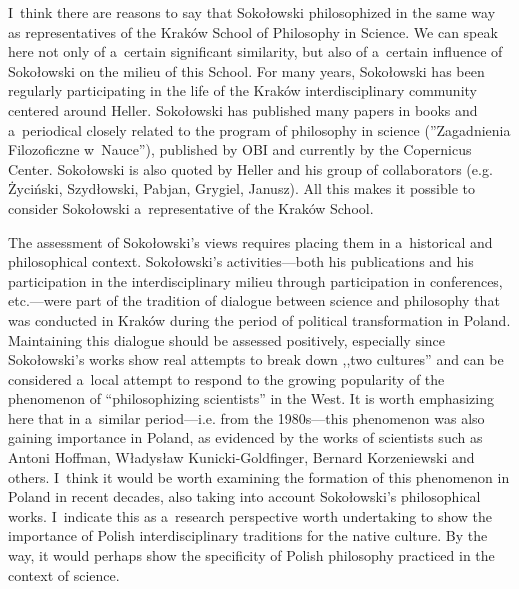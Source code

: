 \documentclass[%
  manuscript=article,
  year=2024,
  volume=77,
  doi=00000.000,
]{zfn}
\begin{document}
I~think there are reasons to say that Sokołowski philosophized in the same way as representatives of the Kraków School of Philosophy in Science. We can speak here not only of a~certain significant similarity, but also of a~certain influence of Sokołowski on the milieu of this School. For many years, Sokołowski has been regularly participating in the life of the Kraków interdisciplinary community centered around Heller. Sokołowski has published many papers in books and a~periodical closely related to the program of philosophy in science (''Zagadnienia Filozoficzne w~Nauce''), published by OBI and currently by the Copernicus Center. Sokołowski is also quoted by Heller and his group of collaborators (e.g. Życiński, Szydłowski, Pabjan, Grygiel, Janusz). All this makes it possible to consider Sokołowski a~representative of the Kraków School.



The assessment of Sokołowski's views requires placing them in a~historical and philosophical context. Sokołowski's activities---both his publications and his participation in the interdisciplinary milieu through participation in conferences, etc.---were part of the tradition of dialogue between science and philosophy that was conducted in Kraków during the period of political transformation in Poland. Maintaining this dialogue should be assessed positively, especially since Sokołowski's works show real attempts to break down ,,two cultures'' 
\parencite[][]{Snow1999Dwie} %
 and can be considered a~local attempt to respond to the growing popularity of the phenomenon of ``philosophizing scientists'' in the West. It is worth emphasizing here that in a~similar period---i.e. from the 1980s---this phenomenon was also gaining importance in Poland, as evidenced by the works of scientists such as Antoni Hoffman, Władysław Kunicki-Goldfinger, Bernard Korzeniewski and others. I~think it would be worth examining the formation of this phenomenon in Poland in recent decades, also taking into account Sokołowski's philosophical works. I~indicate this as a~research perspective worth undertaking to show the importance of Polish interdisciplinary traditions for the native culture. By the way, it would perhaps show the specificity of Polish philosophy practiced in the context of science.
\end{document}
